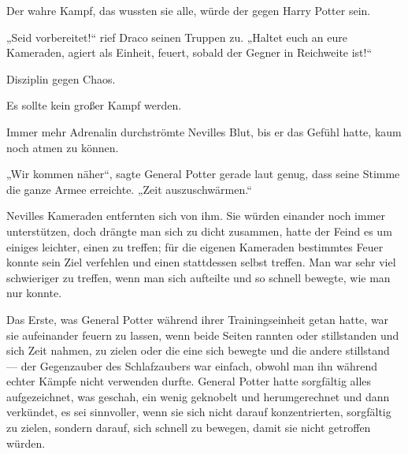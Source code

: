 Der wahre Kampf, das wussten sie alle, würde der gegen Harry Potter sein.

„Seid vorbereitet!“ rief Draco seinen Truppen zu.
„Haltet euch an eure Kameraden, agiert als Einheit, feuert, sobald der Gegner in Reichweite ist!“

Disziplin gegen Chaos.

Es sollte kein großer Kampf werden.

\later

Immer mehr Adrenalin durchströmte Nevilles Blut, bis er das Gefühl hatte, kaum noch atmen zu können.

„Wir kommen näher“, sagte General Potter gerade laut genug, dass seine Stimme die ganze Armee erreichte.
„Zeit auszuschwärmen.“

Nevilles Kameraden entfernten sich von ihm. Sie würden einander noch immer unterstützen, doch drängte man sich zu dicht zusammen, hatte der Feind es um einiges leichter, einen zu treffen; für die eigenen Kameraden bestimmtes Feuer konnte sein Ziel verfehlen und einen stattdessen selbst treffen. Man war sehr viel schwieriger zu treffen, wenn man sich aufteilte und so schnell bewegte, wie man nur konnte.

Das Erste, was General Potter während ihrer Trainingseinheit getan hatte, war sie aufeinander feuern zu lassen, wenn beide Seiten rannten oder stillstanden und sich Zeit nahmen, zu zielen oder die eine sich bewegte und die andere stillstand — der Gegenzauber des Schlafzaubers war einfach, obwohl man ihn während echter Kämpfe nicht verwenden durfte. General Potter hatte sorgfältig alles aufgezeichnet, was geschah, ein wenig geknobelt und herumgerechnet und dann verkündet, es sei sinnvoller, wenn sie sich nicht darauf konzentrierten, sorgfältig zu zielen, sondern darauf, sich schnell zu bewegen, damit sie nicht getroffen würden.

